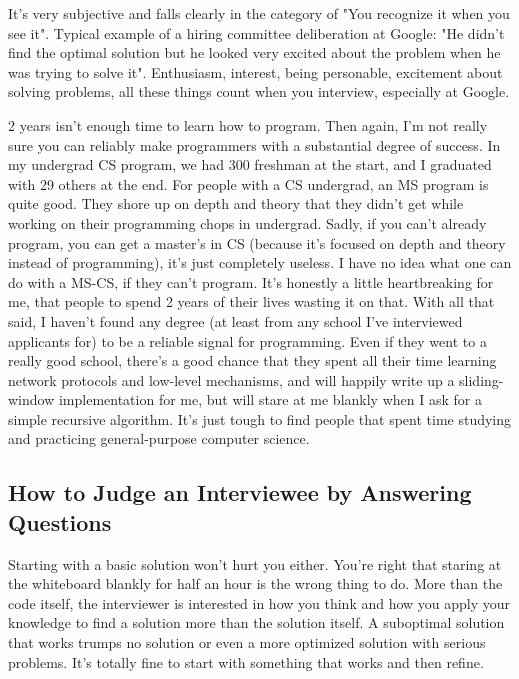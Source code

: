 \documentclass[12pt, reqno, oneside]{amsart}
\begin{document}
It's very subjective and falls clearly in the category of "You recognize it when you see it".
Typical example of a hiring committee deliberation at Google: "He didn't find the optimal solution but he looked very excited about the problem when he was trying to solve it".
Enthusiasm, interest, being personable, excitement about solving problems, all these things count when you interview, especially at Google.
\newline

2 years isn't enough time to learn how to program. Then again, I'm not really sure you can reliably make programmers with a substantial degree of success. In my undergrad CS program, we had 300 freshman at the start, and I graduated with 29 others at the end. For people with a CS undergrad, an MS program is quite good. They shore up on depth and theory that they didn't get while working on their programming chops in undergrad.
Sadly, if you can't already program, you can get a master's in CS (because it's focused on depth and theory instead of programming), it's just completely useless. I have no idea what one can do with a MS-CS, if they can't program. It's honestly a little heartbreaking for me, that people to spend 2 years of their lives wasting it on that.
With all that said, I haven't found any degree (at least from any school I've interviewed applicants for) to be a reliable signal for programming. Even if they went to a really good school, there's a good chance that they spent all their time learning network protocols and low-level mechanisms, and will happily write up a sliding-window implementation for me, but will stare at me blankly when I ask for a simple recursive algorithm. It's just tough to find people that spent time studying and practicing general-purpose computer science.

\subsection{How to Judge an Interviewee by Answering Questions}
Starting with a basic solution won't hurt you either. You're right that staring at the whiteboard blankly for half an hour is the wrong thing to do. More than the code itself, the interviewer is interested in how you think and how you apply your knowledge to find a solution more than the solution itself. A suboptimal solution that works trumps no solution or even a more optimized solution with serious problems. It's totally fine to start with something that works and then refine.
\end{document}
